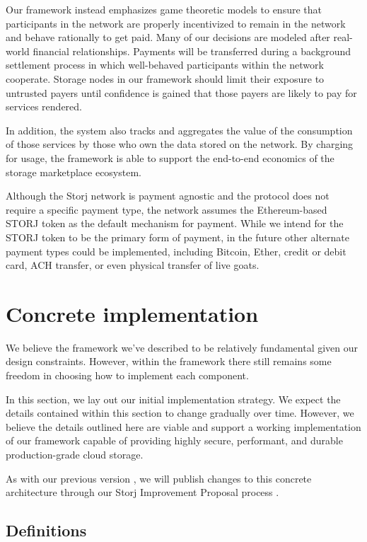 \documentclass[8pt,fleqn,openany]{book}
\begin{document}
Our framework instead emphasizes game theoretic models to ensure
that participants in the network are properly incentivized to remain in the
network and behave rationally to get paid.
Many of our decisions are modeled after real-world financial relationships.
Payments will be transferred during
a background settlement process in which well-behaved participants within
the network cooperate. Storage nodes in our framework should limit their exposure
to untrusted payers until confidence is gained that those payers are likely
to pay for services rendered.

In addition, the system also tracks and aggregates the value of the
consumption of those services by those who own the data stored on the network.
By charging for usage, the framework is able to support the end-to-end
economics of the storage marketplace ecosystem.

Although the Storj network is payment agnostic and
the protocol does not require a specific payment type,
the network assumes the Ethereum-based STORJ token as the default mechanism
for payment. While we intend for the STORJ token to be the primary form of payment, in the future other alternate payment types could be implemented, including Bitcoin,
Ether, credit or debit card, ACH transfer, or even physical transfer of
live goats.

\chapter{Concrete implementation}\label{chap:concrete}

We believe the framework we've described to be relatively fundamental
given our design constraints. However, within the framework there still remains
some freedom in choosing how to implement each component.

In this section, we lay out our initial implementation strategy. We expect
the details contained within this section to change gradually over time.
However, we believe the details outlined here are viable and support a working
implementation of our framework capable of providing highly secure, performant,
and durable production-grade cloud storage.

As with our previous version \cite{storj-v2}, we will publish changes to this
concrete architecture through our Storj Improvement Proposal process \cite{sips}.

\section{Definitions}
\end{document}
